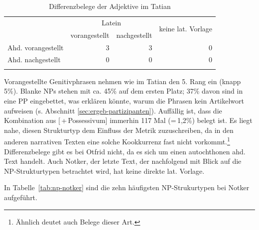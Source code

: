 \begin{table}[H]
\centering
\begin{tabular}{lrrr}
\lsptoprule
                   & \multicolumn{2}{c}{Latein} & \multirow{2}{*}{keine lat. Vorlage}\\
 \cmidrule(lr){2-3}
                   & vorangestellt & nachgestellt & \\ \midrule
Ahd. vorangestellt & 3                  & 3                & 0                    \\
Ahd. nachgestellt  & 0                  & 0                 & 0                    \\ \lspbottomrule
\end{tabular}
\caption{Differenzbelege  der Adjektive  im Tatian}
\label{tab:diff-adj-tatian}
\end{table}

Vorangestellte Genitivphrasen  nehmen wie im Tatian den 5. Rang ein (knapp 5\%). Blanke NPs stehen mit ca. 45\% auf dem ersten Platz; 37\% davon sind in eine PP eingebettet, was erklären könnte, warum die Phrasen kein Artikelwort aufweisen (s. Abschnitt \ref{sec:ergeb-partizipanten}). Auffällig ist, dass die Kombination aus [\,+\,Pos\-ses\-si\-vum] immerhin 117 Mal (=\,1,2\%) belegt ist. Es liegt nahe, diesen Strukturtyp dem Einfluss der Metrik  zuzuschreiben, da in den anderen narrativen Texten eine solche Kookkurrenz fast nicht vorkommt.\footnote{Ähnlich deutet auch \textcite[][555]{Oubouzar1989} Belege dieser Art.}
Differenzbelege  gibt es bei Otfrid nicht, da es sich um einen autochthonen ahd. Text handelt. Auch Notker, der letzte Text, der nachfolgend mit Blick auf die NP-Strukturtypen betrachtet wird, hat keine direkte lat. Vorlage.   


In Tabelle~\ref{tab:np-notker} sind die zehn häufigsten NP-Strukurtypen bei Notker aufgeführt.

